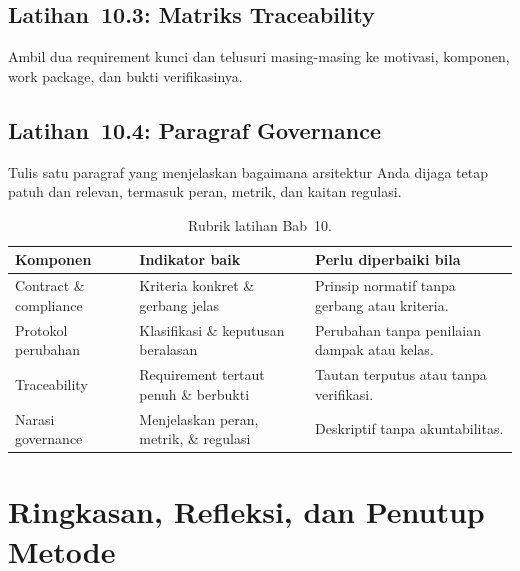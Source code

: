 \subsection*{Latihan~10.3: Matriks Traceability}
Ambil dua requirement kunci dan telusuri masing-masing ke motivasi, komponen,
work package, dan bukti verifikasinya.

\subsection*{Latihan~10.4: Paragraf Governance}
Tulis satu paragraf yang menjelaskan bagaimana arsitektur Anda dijaga tetap patuh
dan relevan, termasuk peran, metrik, dan kaitan regulasi.

\begin{table}[htbp]
\centering
\scriptsize
\caption{Rubrik latihan Bab~10.}
\label{tab:rubrik-bab9-gov}
\begin{tabularx}{\textwidth}{@{}p{} X X@{}}
\hline
\textbf{Komponen} & \textbf{Indikator baik} & \textbf{Perlu diperbaiki bila} \\
\hline
Contract \& compliance & Kriteria konkret \& gerbang jelas & Prinsip normatif tanpa
gerbang atau kriteria. \\
Protokol perubahan & Klasifikasi \& keputusan beralasan & Perubahan tanpa penilaian
dampak atau kelas. \\
Traceability & Requirement tertaut penuh \& berbukti & Tautan terputus atau tanpa
verifikasi. \\
Narasi governance & Menjelaskan peran, metrik, \& regulasi & Deskriptif tanpa
akuntabilitas. \\
\hline
\end{tabularx}
\end{table}

\section{Ringkasan, Refleksi, dan Penutup Metode}

